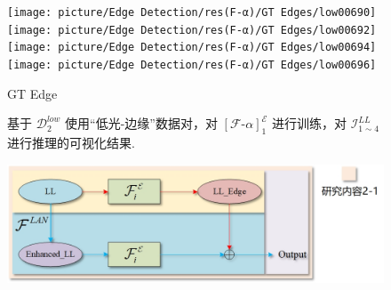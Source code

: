\documentclass[CJK,aspectratio=169]{beamer}  %
\begin{document}
\begin{frame}
\begin{figure}
\begin{minipage}{0.61\linewidth}
			\begin{minipage}{0.16\textwidth}
				\texttt{[image: picture/Edge Detection/res(F-α)/GT Edges/low00690]} \\
				\texttt{[image: picture/Edge Detection/res(F-α)/GT Edges/low00692]} \\
				\texttt{[image: picture/Edge Detection/res(F-α)/GT Edges/low00694]} \\
				\texttt{[image: picture/Edge Detection/res(F-α)/GT Edges/low00696]}
				\caption*{\tiny GT Edge}
			\end{minipage}
			\caption*{\tiny 基于 $\mathcal{D}^{low}_{2}$ 使用“低光-边缘”数据对，对 ${\left[\mathcal{F}\text{-}\alpha\right]}^{\mathcal{E}}_1$ 进行训练，对 $\mathcal{I}_{1 \sim 4}^{LL}$ 进行推理的可视化结果.}
		\end{minipage}	
		\begin{minipage}{0.38\linewidth}
			\begin{minipage}{\textwidth}
				\setlength{\abovecaptionskip}{-0.05cm}
				\centering
				\includegraphics[width=\textwidth]{picture/Edge Detection/DCMP}
				\caption*{\tiny Edge detection network}
			\end{minipage}
			\begin{minipage}{\textwidth}
				\begin{table}[!htbp]
					\centering
					\tiny
\end{table}
\end{minipage}
\end{minipage}
\end{figure}
\end{frame}
\end{document}

